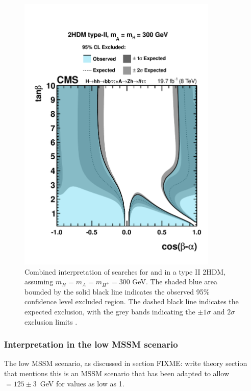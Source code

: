 \begin{figure}[h!]
\begin{center}
\includegraphics[width=0.85\textwidth]{Hhh/Plots/CMS-HIG-14-034_Figure_012.pdf}
\caption{Combined interpretation of searches for \AtoZhtolltautau and 
\Htohhtobbtautau in a type II 2HDM, assuming $m_{H} = m_{A} = m_{H^{+}} = 300$ GeV.
The shaded blue area bounded by the solid black line indicates the observed 
95\% confidence level excluded region. The dashed black line indicates the expected
exclusion, with the grey bands indicating the $\pm 1\sigma$ and $2\sigma$ 
exclusion limits \cite{CMS-HIG-14-034}.}
\label{fig:HhhAZh2HDM}
\end{center}
\end{figure}

\subsubsection{Interpretation in the low \tanb MSSM scenario}
\label{sec:hhh_results_modeldep_lowtb}
The low \tanb MSSM scenario, as discussed in section FIXME: write theory section that mentions this
is an MSSM scenario that has been adapted to allow \mh $=125 \pm 3$~GeV for \tanb values
as low as 1.  

